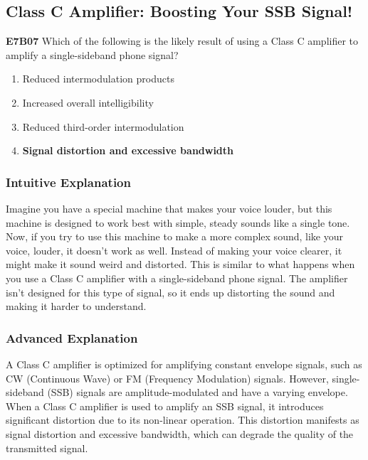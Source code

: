 \subsection{Class C Amplifier: Boosting Your SSB Signal!}

\begin{tcolorbox}[colback=gray!10!white,colframe=black!75!black,title=E7B07]
\textbf{E7B07} Which of the following is the likely result of using a Class C amplifier to amplify a single-sideband phone signal?
\begin{enumerate}[label=\Alph*.]
    \item Reduced intermodulation products
    \item Increased overall intelligibility
    \item Reduced third-order intermodulation
    \item \textbf{Signal distortion and excessive bandwidth}
\end{enumerate}
\end{tcolorbox}

\subsubsection{Intuitive Explanation}
Imagine you have a special machine that makes your voice louder, but this machine is designed to work best with simple, steady sounds like a single tone. Now, if you try to use this machine to make a more complex sound, like your voice, louder, it doesn’t work as well. Instead of making your voice clearer, it might make it sound weird and distorted. This is similar to what happens when you use a Class C amplifier with a single-sideband phone signal. The amplifier isn’t designed for this type of signal, so it ends up distorting the sound and making it harder to understand.

\subsubsection{Advanced Explanation}
A Class C amplifier is optimized for amplifying constant envelope signals, such as CW (Continuous Wave) or FM (Frequency Modulation) signals. However, single-sideband (SSB) signals are amplitude-modulated and have a varying envelope. When a Class C amplifier is used to amplify an SSB signal, it introduces significant distortion due to its non-linear operation. This distortion manifests as signal distortion and excessive bandwidth, which can degrade the quality of the transmitted signal.

